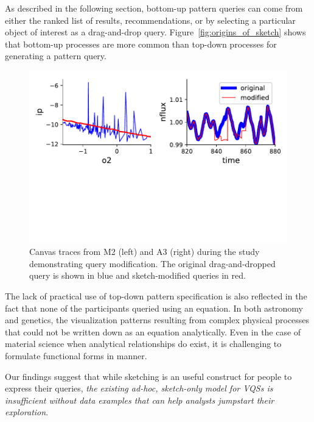 As described in the following section,
bottom-up pattern queries can come from either
the ranked list of results,
recommendations, or by selecting a
particular object of interest as a drag-and-drop query.
Figure~\ref{fig:origins_of_sketch} shows that
bottom-up processes are more common
than top-down processes for generating a pattern query.
\begin{figure}[h!]
    \centering
    \includegraphics[width=\columnwidth]{figures/QueryModificationBySketch.pdf}
    \caption{Canvas traces from M2 (left) and A3 (right) during the study demonstrating query modification. The original drag-and-dropped query is shown in blue and sketch-modified queries in red.}
    \label{query_modification}
    \vspace{-10pt}
\end{figure}
\par The lack of practical use of top-down pattern
specification is also reflected in the fact
that none of the participants queried using an equation.
In both astronomy and genetics, the visualization patterns
resulting from complex physical processes
that could not be written down as an equation analytically.
Even in the case of material science when analytical
relationships do exist, it is challenging to formulate
functional forms in  manner.
\par Our findings suggest that while sketching
is an useful construct for people to express their queries,
\emph{the existing ad-hoc, sketch-only model for VQSs
is insufficient without data examples
that can help analysts jumpstart their exploration}.
